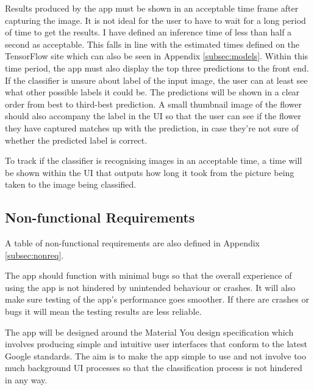 \documentclass[12pt,a4paper]{report}
\begin{document}
\par

Results produced by the app must be shown in an acceptable time frame after capturing the image. It is not ideal for 
the user to have to wait for a long period of time to get the results. I have defined an inference time of less than 
half a second as acceptable. This falls in line with the estimated times defined on the TensorFlow site which can also 
be seen in Appendix \ref{subsec:models}. Within this time period, the app must also display the top three predictions 
to the front end. 
If the classifier is unsure about label of the input image, the user can at least see what other possible labels it 
could be. The predictions will be shown in a clear order from best to third-best prediction. A small thumbnail image of 
the flower should also accompany the label in the UI so that the user can see if the flower they have captured matches 
up with the prediction, in case they're not sure of whether the predicted label is correct. 

\par

To track if the classifier is recognising images in an acceptable time, a time will be shown within the UI that outputs 
how long it took from the picture being taken to the image being classified.

\subsection{Non-functional Requirements}

A table of non-functional requirements are also defined in Appendix \ref{subsec:nonreq}.

\par

The app should function with minimal bugs so that the overall experience of using the app is not hindered by unintended 
behaviour or crashes. It will also make sure testing of the app's performance goes smoother. If there are crashes or 
bugs it will mean the testing results are less reliable.

\par

The app will be designed around the Material You design specification which involves producing simple and intuitive user
interfaces that conform to the latest Google standards. The aim is to make the app simple to use and not involve too 
much background UI processes so that the classification process is not hindered in any way. 
\end{document}

